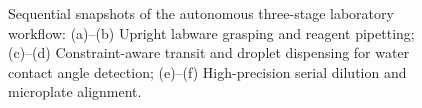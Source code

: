 \documentclass[journal,twocolumn]{IEEEtran}
\begin{document}
\begin{figure}[!t]
    \centering
    \caption{Sequential snapshots of the autonomous three-stage laboratory workflow: (a)--(b) Upright labware grasping and reagent pipetting; (c)--(d) Constraint-aware transit and droplet dispensing for water contact angle detection; (e)--(f) High-precision serial dilution and microplate alignment.}
    \label{fig:sequential_snapshots}
\end{figure}
\end{document}

